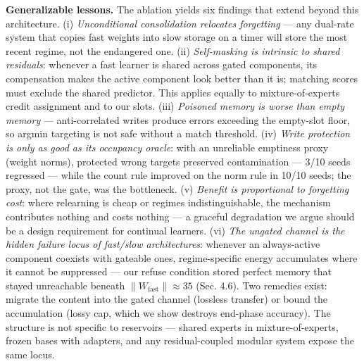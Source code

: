 \documentclass[11pt]{article}
\begin{document}
\textbf{Generalizable lessons.} The ablation yields six findings that
extend beyond this architecture. (i) \emph{Unconditional consolidation
relocates forgetting} --- any dual-rate system that copies fast weights
into slow storage on a timer will store the most recent regime, not
the endangered one. (ii) \emph{Self-masking is intrinsic to shared
residuals}: whenever a fast learner is shared across gated
components, its compensation makes the active component look better
than it is; matching scores must exclude the shared predictor. This
applies equally to mixture-of-experts credit assignment and to our
slots. (iii) \emph{Poisoned memory is worse than empty memory} ---
anti-correlated writes produce errors exceeding the empty-slot floor,
so argmin targeting is not safe without a match threshold.
(iv) \emph{Write protection is only as good as its occupancy oracle}:
with an unreliable emptiness proxy (weight norms), protected wrong
targets preserved contamination --- 3/10 seeds regressed --- while the
count rule improved on the norm rule in 10/10 seeds; the proxy, not
the gate, was the bottleneck. (v) \emph{Benefit is proportional
to forgetting cost}: where relearning is cheap or regimes
indistinguishable, the mechanism contributes nothing and costs
nothing --- a graceful degradation we argue should be a design
requirement for continual learners. (vi) \emph{The ungated channel is
the hidden failure locus of fast/slow architectures}: whenever an
always-active component coexists with gateable ones, regime-specific
energy accumulates where it cannot be suppressed --- our refuse
condition stored perfect memory that stayed unreachable beneath
\(\|W_{\mathrm{fast}}\|{\approx}35\) (Sec. 4.6). Two remedies exist:
migrate the content into the gated channel (lossless transfer) or
bound the accumulation (lossy cap, which we show destroys end-phase
accuracy). The structure is not specific to reservoirs --- shared
experts in mixture-of-experts, frozen bases with adapters, and any
residual-coupled modular system expose the same locus.
\end{document}
